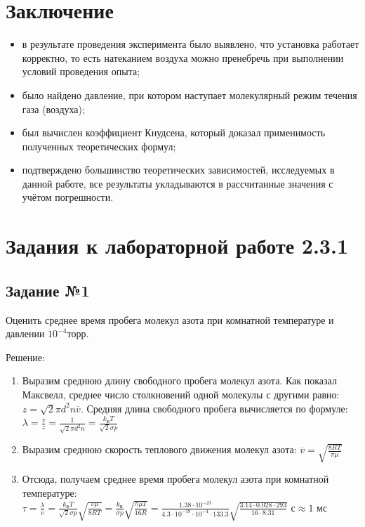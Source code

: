 \documentclass[a4paper, 12pt]{article}
\begin{document}
    \section*{Заключение}

    \begin{itemize}
        \item в результате проведения эксперимента было выявлено, что установка работает корректно, то есть натеканием воздуха можно пренебречь при выполнении условий проведения опыта;

        \item было найдено давление, при котором наступает молекулярный режим течения газа (воздуха); 

        \item был вычислен коэффициент Кнудсена, который доказал применимость полученных теоретических формул;
        
        \item подтверждено большинство теоретических зависимостей, исследуемых в данной работе, все результаты укладываются в рассчитанные значения с учётом погрешности.
    \end{itemize}

    \newpage

    \section*{Задания к лабораторной работе 2.3.1}
        \subsection*{Задание №1}
            Оценить среднее время пробега молекул азота при комнатной температуре и давлении $10^{-4} торр$.

            Решение:
            \begin{enumerate}
                \item Выразим среднюю длину свободного пробега молекул азота. Как показал Максвелл, среднее число столкновений одной молекулы с другими равно: $z = \sqrt{2} \pi d^2 n \overline{v}$. Средняя длина свободного пробега вычисляется по формуле: $\lambda = \frac{\overline{v}}{z} = \frac{1}{\sqrt{2} \pi d^2 n} = \frac{k_{\text{Б}} T}{\sqrt{2} \sigma p}$
                \item Выразим среднюю скорость теплового движения молекул азота: $\overline{v} = \sqrt{\frac{8RT}{\pi \mu}}$
                \item Отсюда, получаем среднее время пробега молекул азота при комнатной температуре: $\tau = \frac{\lambda}{\overline{v}} = \frac{k_{\text{Б}} T}{\sqrt{2} \sigma p} \sqrt{\frac{\pi \mu}{8RT}} = \frac{k_{\text{Б}}}{\sigma p} \sqrt{\frac{\pi \mu T}{16R}} = \frac{1.38 \cdot 10^{-23}}{4.3 \cdot 10^{-19} \cdot 10^{-4} \cdot 133.3} \sqrt{\frac{3.14 \cdot 0.028 \cdot 293}{16 \cdot 8.31}} \text{ с} \approx 1 \text{ мс}$
            \end{enumerate}
\end{document}

